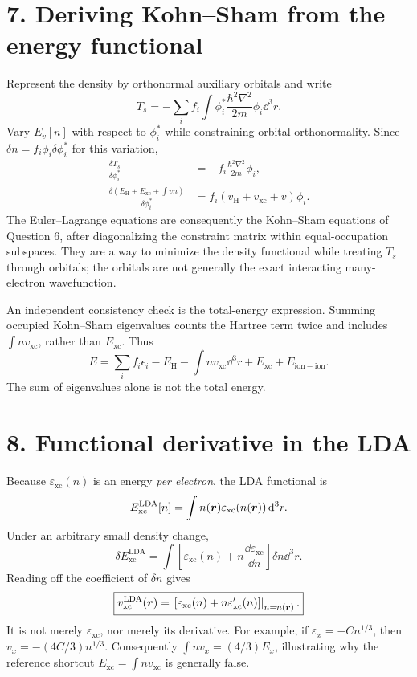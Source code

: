 \section*{7. Deriving Kohn--Sham from the energy functional}
Represent the density by orthonormal auxiliary orbitals and write
\[
T_s=-\sum_i f_i\int\phi_i^*\frac{\hbar^2\nabla^2}{2m}\phi_i\dd^3r.
\]
Vary $E_v[n]$ with respect to $\phi_i^*$ while constraining orbital orthonormality. Since $\delta n=f_i\phi_i\delta\phi_i^*$ for this variation,
\begin{align*}
\frac{\delta T_s}{\delta\phi_i^*}&=-f_i\frac{\hbar^2\nabla^2}{2m}\phi_i,\\
\frac{\delta(E_{\mathrm H}+E_{\mathrm{xc}}+\int vn)}{\delta\phi_i^*}
&=f_i(v_{\mathrm H}+v_{\mathrm{xc}}+v)\phi_i.
\end{align*}
The Euler--Lagrange equations are consequently the Kohn--Sham equations of Question 6, after diagonalizing the constraint matrix within equal-occupation subspaces. They are a way to minimize the density functional while treating $T_s$ through orbitals; the orbitals are not generally the exact interacting many-electron wavefunction.

An independent consistency check is the total-energy expression. Summing occupied Kohn--Sham eigenvalues counts the Hartree term twice and includes $\int nv_{\mathrm{xc}}$, rather than $E_{\mathrm{xc}}$. Thus
\[
\boxed{E=\sum_i f_i\epsilon_i-E_{\mathrm H}
-\int n v_{\mathrm{xc}}\dd^3r+E_{\mathrm{xc}}+E_{\mathrm{ion-ion}}.}
\]
The sum of eigenvalues alone is not the total energy.

\section*{8. Functional derivative in the LDA}
Because $\varepsilon_{\mathrm{xc}}(n)$ is an energy \emph{per electron}, the LDA functional is
\[
E_{\mathrm{xc}}^{\mathrm{LDA}}[n]=\int n(\boldsymbol{r})\varepsilon_{\mathrm{xc}}(n(\boldsymbol{r}))\mathop{}\!\mathrm{d}^3r.
\]
Under an arbitrary small density change,
\[
\delta E_{\mathrm{xc}}^{\mathrm{LDA}}
=\int\left[\varepsilon_{\mathrm{xc}}(n)+n\frac{\dd\varepsilon_{\mathrm{xc}}}{\dd n}\right]\delta n\dd^3r.
\]
Reading off the coefficient of $\delta n$ gives
\[
\boxed{v_{\mathrm{xc}}^{\mathrm{LDA}}(\boldsymbol{r})
=\left.\left[\varepsilon_{\mathrm{xc}}(n)+n\varepsilon_{\mathrm{xc}}'(n)\right]\right|_{n=n(\boldsymbol{r})}.}
\]
It is not merely $\varepsilon_{\mathrm{xc}}$, nor merely its derivative. For example, if $\varepsilon_x=-C n^{1/3}$, then $v_x=-(4C/3)n^{1/3}$. Consequently $\int n v_x=(4/3)E_x$, illustrating why the reference shortcut $E_{\mathrm{xc}}=\int n v_{\mathrm{xc}}$ is generally false.

